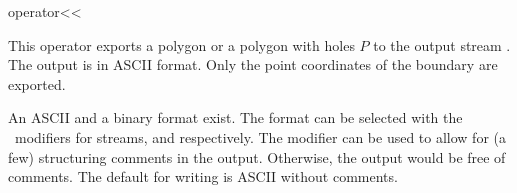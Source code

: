 
\ccHtmlNoClassLinks
\begin{ccRefFunction}{operator<<}
\label{refPolygon_with_holes_operator_leftshift}

\ccDefinition

This operator exports a polygon or a polygon with holes $P$ to the
output stream . The output is in ASCII format. Only the point
coordinates of the boundary are exported.

An ASCII and a binary format exist. The format can be selected with
the \cgal\ modifiers for streams,  and
 respectively. The modifier 
can be used to allow for (a few) structuring comments in the
output. Otherwise, the output would be free of comments.  The default
for writing is ASCII without comments.


  

  
\ccSeeAlso

\\ 
\\ 

\end{ccRefFunction}
